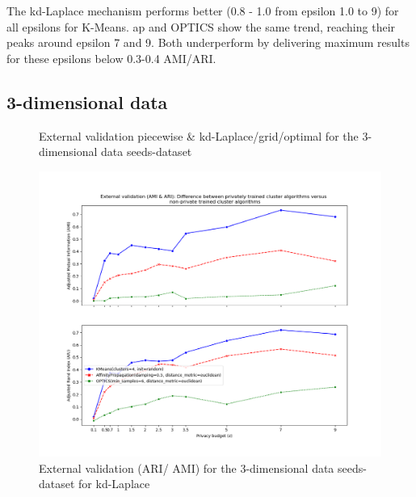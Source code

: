 The kd-Laplace mechanism performs better (0.8 - 1.0 from epsilon 1.0 to 9) for all epsilons for K-Means.
\gls{ap} and OPTICS show the same trend, reaching their peaks around epsilon 7 and 9.
Both underperform by delivering maximum results for these epsilons below 0.3-0.4 AMI/ARI.\newline
\newpage
\subsection{3-dimensional data}
\begin{figure}[H]
    \caption{External validation piecewise \& kd-Laplace/grid/optimal for the 3-dimensional data seeds-dataset}
    \centering
    \begin{minipage}[c]{0.60\textwidth}
        \includegraphics[width=1\textwidth]{Results/3d-laplace-optimal-truncated/seeds-dataset/ami-and-ari.png}
        \caption{External validation (ARI/ AMI) for the 3-dimensional data seeds-dataset for kd-Laplace}
        \label{fig:external-validation-seeds-dataset_comparison_3d-laplace}
    \end{minipage}
    \begin{minipage}[c]{0.60\textwidth}

\end{minipage}
\end{figure}

